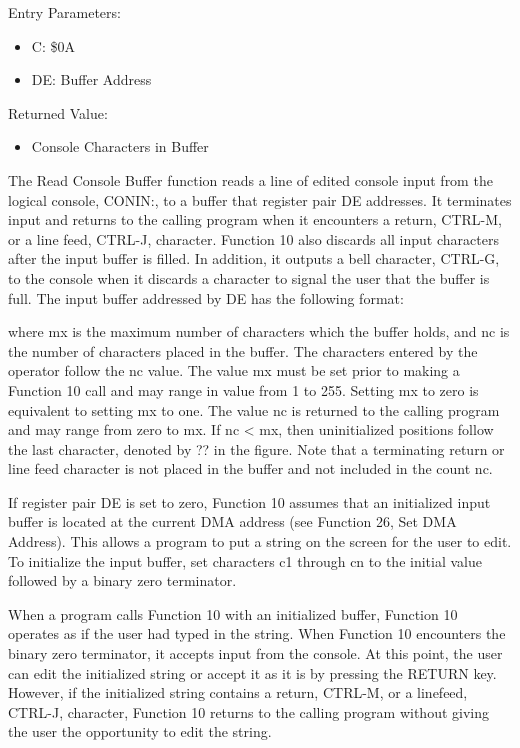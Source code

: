 Entry Parameters:
\begin{itemize}
\item[] C: \$0A
\item[] DE: Buffer Address
\end{itemize}

Returned Value:
\begin{itemize}
\item[] Console Characters in Buffer
\end{itemize}

The Read Console Buffer function reads a line of edited console input
from the logical console, CONIN:, to a buffer that register pair DE
addresses. It terminates input and returns to the calling program when
it encounters a return, CTRL-M, or a line feed, CTRL-J,
character. Function 10 also discards all input characters after the
input buffer is filled. In addition, it outputs a bell character,
CTRL-G, to the console when it discards a character to signal the user
that the buffer is full. The input buffer addressed by DE has the
following format:


where mx is the maximum number of characters which the buffer holds,
and nc is the number of characters placed in the buffer. The
characters entered by the operator follow the nc value. The value mx
must be set prior to making a Function 10 call and may range in value
from 1 to 255. Setting mx to zero is equivalent to setting mx to
one. The value nc is returned to the calling program and may range
from zero to mx. If nc < mx, then uninitialized positions follow the
last character, denoted by ??  in the figure. Note that a terminating
return or line feed character is not placed in the buffer and not
included in the count nc.

If register pair DE is set to zero, Function 10 assumes that an
initialized input buffer is located at the current DMA address (see
Function 26, Set DMA Address).  This allows a program to put a string
on the screen for the user to edit. To initialize the input buffer,
set characters c1 through cn to the initial value followed by a binary
zero terminator.

When a program calls Function 10 with an initialized buffer, Function
10 operates as if the user had typed in the string. When Function 10
encounters the binary zero terminator, it accepts input from the
console. At this point, the user can edit the initialized string or
accept it as it is by pressing the RETURN key. However, if the
initialized string contains a return, CTRL-M, or a linefeed, CTRL-J,
character, Function 10 returns to the calling program without giving
the user the opportunity to edit the string.

